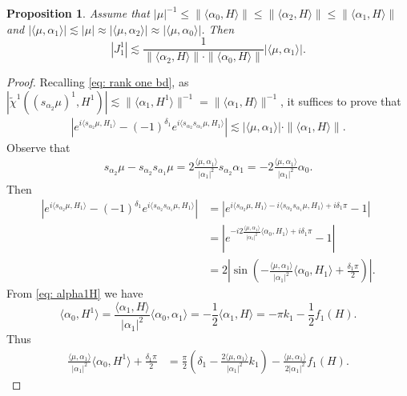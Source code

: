 \documentclass{amsart}
\numberwithin{equation}{section}
\newtheorem{prop}[thm]{Proposition}
\numberwithin{equation}{section}
\begin{document}
\begin{prop}\label{prop: tilde J1}
Assume that $|\mu|^{-1}\leq \|\langle\alpha_0,H\rangle\|\leq \|\langle\alpha_2,H\rangle\|\leq \|\langle\alpha_1,H\rangle\|$ and $| \langle\mu,\alpha_1\rangle|\lesssim |\mu|\approx |\langle\mu,\alpha_2\rangle|\approx |\langle\mu,\alpha_0\rangle|$. Then
    $$|J^1_1|\lesssim \frac{1}{\|\langle\alpha_2,H\rangle\|\cdot \|\langle\alpha_0,H\rangle\|}|\langle\mu,\alpha_1\rangle|.$$
\end{prop}
\begin{proof}
Recalling \eqref{eq: rank one bd}, as $|\widetilde{\chi}^1({(s_{\alpha_2}\mu)^1}, H^1)|\lesssim \|\langle\alpha_1,H^1\rangle\|^{-1}=\|\langle\alpha_1,H\rangle\|^{-1}$, it suffices to prove that 
\begin{align}\label{eq: proving tilde J1}
    \left|e^{i\langle s_{\alpha_2}\mu, H_{1}\rangle}-(-1)^{\delta_1} e^{i\langle s_{\alpha_2}s_{\alpha_1}\mu, H_{1}\rangle}\right|
    \lesssim   |\langle\mu,\alpha_1\rangle |\cdot\|\langle\alpha_1,H\rangle\|.
\end{align}
Observe that 
\begin{align}\label{eq: simple difference case 3}
    s_{\alpha_2}\mu-s_{\alpha_2}s_{\alpha_1}\mu=2\frac{\langle\mu,\alpha_1\rangle}{|\alpha_1|^2}s_{\alpha_2}\alpha_1
    =-2\frac{\langle\mu,\alpha_1\rangle}{|\alpha_1|^2}\alpha_0.
\end{align}
Then 
\begin{align*}
  \left|e^{i\langle s_{\alpha_2}\mu, H_{1}\rangle}-(-1)^{\delta_1} e^{i\langle s_{\alpha_2}s_{\alpha_1}\mu, H_{1}\rangle}\right|
&=\left|e^{i\langle s_{\alpha_2}\mu, H_{1}\rangle-i\langle s_{\alpha_2}s_{\alpha_1}\mu, H_{1}\rangle+i{\delta_1}\pi }-1\right|\\
&=\left|e^{-i2\frac{\langle\mu,\alpha_1\rangle}{|\alpha_1|^2}\langle \alpha_0, H_{1}\rangle+i{\delta_1}\pi }-1\right|\\
&=2\left|\sin\left(-\frac{\langle\mu,\alpha_1\rangle}{|\alpha_1|^2}\langle \alpha_0, H_{1}\rangle+\frac{{\delta_1} \pi}{2}\right)\right|.
\end{align*}
From \eqref{eq: alpha1H} we have 
$$\langle\alpha_0,H^1\rangle=\frac{\langle\alpha_1, H\rangle}{|\alpha_1|^2}\langle\alpha_0,\alpha_1\rangle=-\frac{1}{2}\langle\alpha_1, H\rangle=-\pi k_1-\frac12 f_1(H).$$
Thus 
\begin{align*}
   \frac{\langle\mu,\alpha_1\rangle}{|\alpha_1|^2}\langle \alpha_0, H^{1}\rangle+\frac{{\delta_1} \pi}{2}
    &=\frac{\pi}{2}\left({\delta_1}- \frac{2\langle\mu,\alpha_1\rangle }{|\alpha_1|^2}k_1\right)- \frac{\langle\mu,\alpha_1\rangle}{2|\alpha_1|^2}f_1(H).

\end{align*}
\end{proof}
\end{document}
